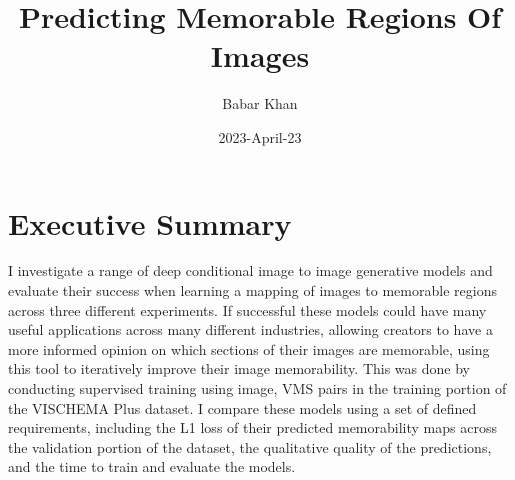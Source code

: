 \documentclass{UoYCSproject}
\author{Babar Khan}
\title{Predicting Memorable Regions Of Images}
\date{2023-April-23}
\begin{document}
\maketitle

\tableofcontents

\chapter{Executive Summary}

I investigate a range of deep conditional image to image generative models and evaluate their success when learning a mapping of images to memorable regions across three different experiments. If successful these models could have many useful applications across many different industries, allowing creators to have a more informed opinion on which sections of their images are memorable, using this tool to iteratively improve their image memorability.
This was done by conducting supervised training using image, VMS pairs in the training portion of the VISCHEMA Plus dataset. I compare these models using a set of defined requirements, including the L1 loss of their predicted memorability maps across the validation portion of the dataset, the qualitative quality of the predictions, and the time to train and evaluate the models.


\end{document}
